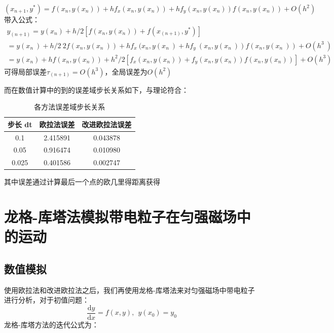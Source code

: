 \documentclass[11pt]{article}
\begin{document}
\begin{equation*}
    \left(x_{n+1},y^\ast\right)=f\left(x_n,y\left(x_n\right)\right)+hf_x\left(x_n,y\left(x_n\right)\right)+hf_y\left(x_n,y\left(x_n\right)\right)f\left(x_n,y\left(x_n\right)\right)+O\left(h^2\right)
\end{equation*}
带入公式：
\begin{equation*}
    \begin{gathered}    y_{\left(n+1\right)}=y\left(x_n\right)+h/2\left[f\left(x_n,y\left(x_n\right)\right)+f\left(x_{\left(n+1\right)},y^\ast\right)\right]\\
    =y(x_n\ )+h/2\ {2f(x_n,y(x_n\ ))+hf_x\ (x_n,y(x_n\ )+hf_y\ (x_n,y(x_n\ ))f(x_n,y(x_n\ ))}+O(h^3\ )\\
    =y\left(x_n\right)+hf\left(x_n,y\left(x_n\right)\right)+h^2/2\left[f_x\left(x_n,y\left(x_n\right)\right)+f_y\left(x_n,y\left(x_n\right)\right)f\left(x_n,y\left(x_n\right)\right)\right]+O\left(h^3\right)
    \end{gathered}
\end{equation*}
可得局部误差$\tau_{\left(n+1\right)}=O\left(h^3\right)$，全局误差为$O\left(h^2\right)$


而在数值计算中的到的误差域步长关系如下，与理论符合：

\begin{table}[h]
    \centering
    \begin{tabular}{|c|c|c|}
        \hline
        步长 dt & 欧拉法误差 & 改进欧拉法误差\\ \hline
         0.1& 2.415891 & 0.043878\\ \hline
         0.05& 0.916474 & 0.010980\\ \hline
         0.025& 0.401586 & 0.002747\\ \hline
    \end{tabular}
    \caption{各方法误差域步长关系}
    \label{tab:my_label1}
\end{table}
其中误差通过计算最后一个点的欧几里得距离获得

\section{龙格-库塔法模拟带电粒子在匀强磁场中的运动}
\subsection{数值模拟}
    使用欧拉法和改进欧拉法之后，我们再使用龙格-库塔法来对匀强磁场中带电粒子进行分析，对于初值问题：
    \begin{equation*}
        \frac{\mathrm{d}y}{\mathrm{d}x}=f(x,y),\ \ y(x_0)=y_0
    \end{equation*}
    龙格-库塔方法的迭代公式为：
    
\end{document}
